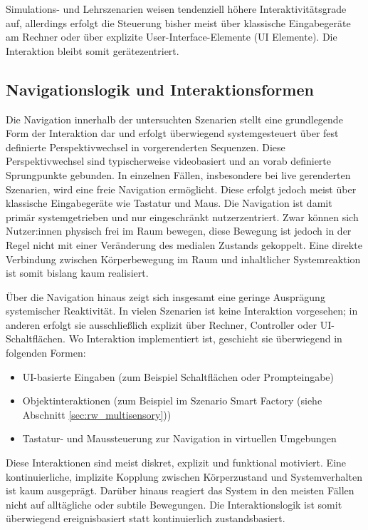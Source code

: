 Simulations- und Lehrszenarien weisen tendenziell höhere Interaktivitätsgrade auf, allerdings erfolgt die Steuerung bisher meist über klassische Eingabegeräte am Rechner oder über explizite User-Interface-Elemente (UI Elemente). Die Interaktion bleibt somit gerätezentriert.


\subsection{Navigationslogik und Interaktionsformen}
Die Navigation innerhalb der untersuchten Szenarien stellt eine grundlegende Form der Interaktion dar und erfolgt überwiegend systemgesteuert über fest definierte Perspektivwechsel in vorgerenderten Sequenzen. Diese Perspektivwechsel sind typischerweise videobasiert und an vorab definierte Sprungpunkte gebunden.
In einzelnen Fällen, insbesondere bei live gerenderten Szenarien, wird eine freie Navigation ermöglicht. Diese erfolgt jedoch meist über klassische Eingabegeräte wie Tastatur und Maus. Die Navigation ist damit primär systemgetrieben und nur eingeschränkt nutzerzentriert. Zwar können sich Nutzer:innen physisch frei im Raum bewegen, diese Bewegung ist jedoch in der Regel nicht mit einer Veränderung des medialen Zustands gekoppelt. Eine direkte Verbindung zwischen Körperbewegung im Raum und inhaltlicher Systemreaktion ist somit bislang kaum realisiert.

Über die Navigation hinaus zeigt sich insgesamt eine geringe Ausprägung systemischer Reaktivität. In vielen Szenarien ist keine Interaktion vorgesehen; in anderen erfolgt sie ausschließlich explizit über Rechner, Controller oder UI-Schaltflächen.
Wo Interaktion implementiert ist, geschieht sie überwiegend in folgenden Formen:
\begin{itemize}
\item UI-basierte Eingaben (zum Beispiel Schaltflächen oder Prompteingabe)
\item Objektinteraktionen (zum Beispiel im Szenario Smart Factory (siehe Abschnitt \ref{sec:rw_multisensory}))
\item Tastatur- und Maussteuerung zur Navigation in virtuellen Umgebungen
\end{itemize}

Diese Interaktionen sind meist diskret, explizit und funktional motiviert. Eine kontinuierliche, implizite Kopplung zwischen Körperzustand und Systemverhalten ist kaum ausgeprägt. Darüber hinaus reagiert das System in den meisten Fällen nicht auf alltägliche oder subtile Bewegungen. Die Interaktionslogik ist somit überwiegend ereignisbasiert statt kontinuierlich zustandsbasiert.

